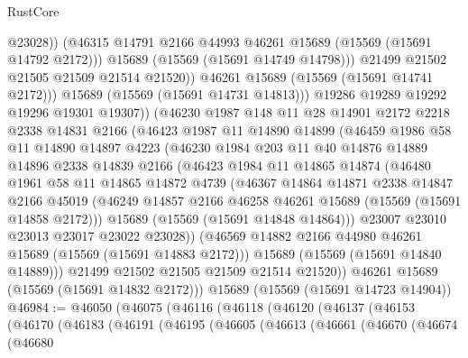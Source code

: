 \begin{lexlean}{RustCore}
\begin{coremodule}
                      @23028))
                  (@46315 @14791 @2166 @44993 @46261 @15689 (@15569 (@15691 @14792 @2172)))
                  @15689
                  (@15569 (@15691 @14749 @14798)))
                @21499
                @21502
                @21505
                @21509
                @21514
                @21520))
            @46261
            @15689
            (@15569 (@15691 @14741 @2172)))
          @15689
          (@15569 (@15691 @14731 @14813)))
        @19286
        @19289
        @19292
        @19296
        @19301
        @19307))
    (@46230
      @1987
      @148
      @11
      @28
      @14901
      @2172
      @2218
      @2338
      @14831
      @2166
      (@46423
        @1987
        @11
        @14890
        @14899
        (@46459
          @1986
          @58
          @11
          @14890
          @14897
          @4223
          (@46230
            @1984
            @203
            @11
            @40
            @14876
            @14889
            @14896
            @2338
            @14839
            @2166
            (@46423
              @1984
              @11
              @14865
              @14874
              (@46480
                @1961
                @58
                @11
                @14865
                @14872
                @4739
                (@46367
                  @14864
                  @14871
                  @2338
                  @14847
                  @2166
                  @45019
                  (@46249 @14857 @2166 @46258 @46261 @15689 (@15569 (@15691 @14858 @2172)))
                  @15689
                  (@15569 (@15691 @14848 @14864)))
                @23007
                @23010
                @23013
                @23017
                @23022
                @23028))
            (@46569 @14882 @2166 @44980 @46261 @15689 (@15569 (@15691 @14883 @2172)))
            @15689
            (@15569 (@15691 @14840 @14889)))
          @21499
          @21502
          @21505
          @21509
          @21514
          @21520))
      @46261
      @15689
      (@15569 (@15691 @14832 @2172)))
    @15689
    (@15569 (@15691 @14723 @14904))
@46984 := @46050
    (@46075
      (@46116
        (@46118
          (@46120
            (@46137
              (@46153
                (@46170
                  (@46183
                    (@46191
                      (@46195
                        (@46605
                          (@46613
                            (@46661
                              (@46670
                                (@46674
                                  (@46680

\end{coremodule}
\end{lexlean}
